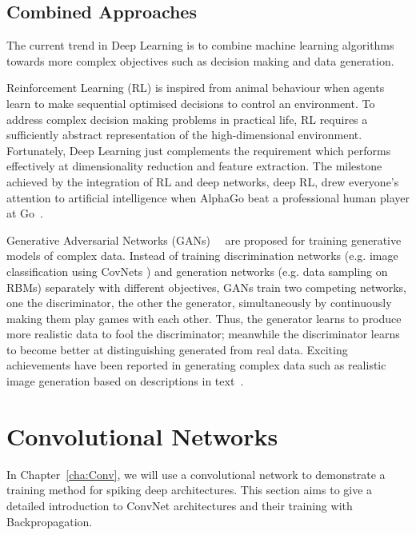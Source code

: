 \subsection{Combined Approaches}
The current trend in Deep Learning is to combine machine learning algorithms towards more complex objectives such as decision making and data generation.

Reinforcement Learning (RL) is inspired from animal behaviour when agents learn to make sequential optimised decisions to control an environment.
To address complex decision making problems in practical life, RL requires a sufficiently abstract representation of the high-dimensional environment.
Fortunately, Deep Learning just complements the requirement which performs effectively at dimensionality reduction and feature extraction.
The milestone achieved by the integration of RL and deep networks, deep RL, drew everyone's attention to artificial intelligence when AlphaGo beat a professional human player at Go~\citep{silver2016mastering}.

Generative Adversarial Networks (GANs)~~\citep{goodfellow2014generative} are proposed for training generative models of complex data.
Instead of training discrimination networks (e.g. image classification using CovNets ) and generation networks (e.g. data sampling on RBMs) separately with different objectives, GANs train two competing networks, one the discriminator, the other the generator, simultaneously by continuously making them play games with each other.
Thus, the generator learns to produce more realistic data to fool the discriminator; meanwhile the discriminator learns to become better at distinguishing generated from real data.
Exciting achievements have been reported in generating complex data such as realistic image generation based on descriptions in text~\citep{radford2015unsupervised}.

\section{Convolutional Networks}
\label{sec:convnet}
In Chapter~\ref{cha:Conv}, we will use a convolutional network to demonstrate a training method for spiking deep architectures.
This section aims to give a detailed introduction to ConvNet architectures and their training with Backpropagation.
